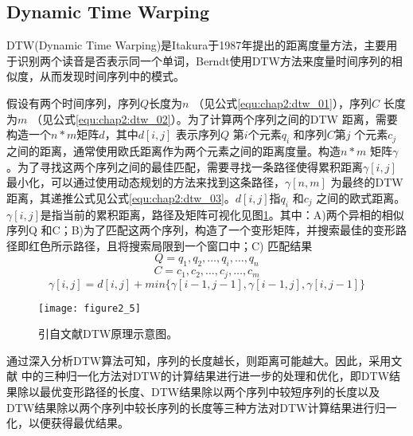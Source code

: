 \subsection{Dynamic Time Warping}
DTW(Dynamic Time Warping)是Itakura于1987年提出的距离度量方法，主要用于识别两个读音是否表示同一个单词，Berndt使用DTW方法来度量时间序列的相似度，从而发现时间序列中的模式。
\par 假设有两个时间序列，序列$Q$长度为$n$ （见公式\ref{equ:chap2:dtw_01}），序列$C$ 长度为$m$ （见公式\ref{equ:chap2:dtw_02}）。为了计算两个序列之间的DTW 距离，需要构造一个$n \ast m$矩阵$d$，其中$d[i,j]$ 表示序列$Q$ 第$i$个元素$q_{i}$ 和序列$C$第$j$ 个元素$c_{j}$之间的距离，通常使用欧氏距离作为两个元素之间的距离度量。构造$n \ast m$ 矩阵$\gamma$。为了寻找这两个序列之间的最佳匹配，需要寻找一条路径使得累积距离$\gamma[i,j]$最小化，可以通过使用动态规划的方法来找到这条路径，$\gamma[n,m]$ 为最终的DTW距离，其递推公式见公式\ref{equ:chap2:dtw_03}。$d[i,j]$指$q_{i}$ 和$c_{j}$ 之间的欧式距离。$\gamma[i,j]$是指当前的累积距离，路径及矩阵可视化见图\ref{fig:2_5}。其中：A)两个异相的相似序列Q 和C；B)为了匹配这两个序列，构造了一个变形矩阵，并搜索最佳的变形路径即红色所示路径，且将搜索局限到一个窗口中；C) 匹配结果
\begin{equation}
\label{equ:chap2:dtw_01}
Q=q_{1},q_{2},…,q_{i},…,q_{n}
\end{equation}
\begin{equation}
\label{equ:chap2:dtw_02}
C=c_{1},c_{2},…,c_{j},…,c_{m}
\end{equation}
\begin{equation}
\label{equ:chap2:dtw_03}
\gamma[i,j]=d[i,j]+min\{\gamma[i-1,j-1],\gamma[i-1,j],\gamma[i,j-1]\}
\end{equation}
\begin{figure}[htp]
\centering
\texttt{[image: figure2\_5]}
\caption{引自文献\cite{ratanamahatana2004everything}DTW原理示意图。}
\label{fig:2_5}
\end{figure}
\par 通过深入分析DTW算法可知，序列的长度越长，则距离可能越大。因此，采用文献\cite{ratanamahatana2004everything} 中的三种归一化方法对DTW的计算结果进行进一步的处理和优化，即DTW结果除以最优变形路径的长度、DTW结果除以两个序列中较短序列的长度以及DTW结果除以两个序列中较长序列的长度等三种方法对DTW计算结果进行归一化，以便获得最优结果。
